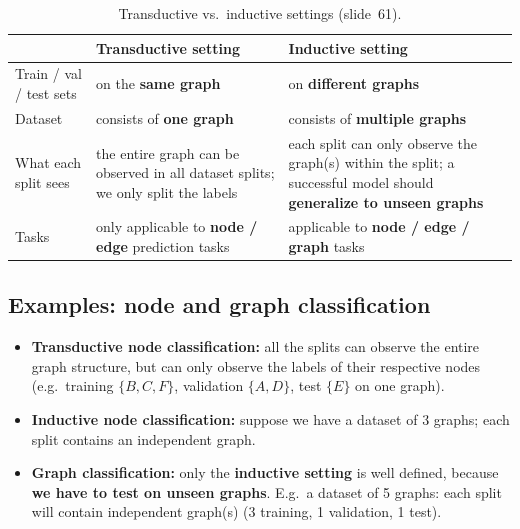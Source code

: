 \begin{table}[htbp]
  \centering\small
  \caption{Transductive vs.\ inductive settings (slide~61).}
  \label{tab:lec05-settings}
  \renewcommand{\arraystretch}{1.2}
  \begin{tabularx}{\textwidth}{@{}>{\raggedright\arraybackslash}p{2.4cm}>{\raggedright\arraybackslash}X>{\raggedright\arraybackslash}X@{}}
    \toprule
    & \textbf{Transductive setting} & \textbf{Inductive setting}\\
    \midrule
    Train / val / test sets & on the \textbf{same graph} & on \textbf{different
      graphs}\\
    Dataset & consists of \textbf{one graph} & consists of \textbf{multiple
      graphs}\\
    What each split sees & the entire graph can be observed in all dataset
      splits; we only split the labels
      & each split can only observe the graph(s) within the split; a successful
      model should \textbf{generalize to unseen graphs}\\
    Tasks & only applicable to \textbf{node / edge} prediction tasks
      & applicable to \textbf{node / edge / graph} tasks\\
    \bottomrule
  \end{tabularx}
\end{table}

\subsection{Examples: node and graph classification}\label{sec:lec05-nodegraph}

\begin{itemize}
  \item \textbf{Transductive node classification:} all the splits can observe
    the entire graph structure, but can only observe the labels of their
    respective nodes (e.g.\ training $\{B,C,F\}$, validation $\{A,D\}$, test
    $\{E\}$ on one graph).
  \item \textbf{Inductive node classification:} suppose we have a dataset of 3
    graphs; each split contains an independent graph.
  \item \textbf{Graph classification:} only the \textbf{inductive setting} is
    well defined, because \textbf{we have to test on unseen graphs}. E.g.\ a
    dataset of 5 graphs: each split will contain independent graph(s) (3
    training, 1 validation, 1 test).
\end{itemize}


